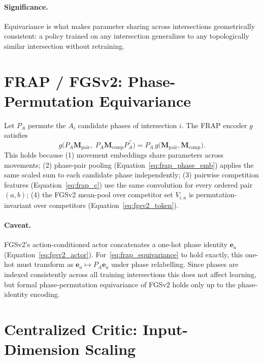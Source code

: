 \paragraph{Significance.} Equivariance is what makes parameter sharing across intersections geometrically consistent: a policy trained on any intersection generalizes to any topologically similar intersection without retraining.

\section{FRAP / FGSv2: Phase-Permutation Equivariance}
\label{sec:Appendix_FRAP_equivariance}

Let $P_A$ permute the $A_i$ candidate phases of intersection $i$. The FRAP encoder $g$ satisfies
\begin{equation}
  g\bigl(P_A\mathbf{M}_{\mathrm{pair}},\; P_A\mathbf{M}_{\mathrm{comp}}P_A^\top\bigr)
  = P_A\,g\bigl(\mathbf{M}_{\mathrm{pair}},\mathbf{M}_{\mathrm{comp}}\bigr).
  \label{eq:frap_equivariance}
\end{equation}
This holds because (1) movement embeddings share parameters across movements; (2) phase-pair pooling (Equation~\ref{eq:frap_phase_emb}) applies the same scaled sum to each candidate phase independently; (3) pairwise competition features (Equation~\ref{eq:frap_c}) use the same convolution for every ordered pair $(a,b)$; (4) the FGSv2 mean-pool over competitor set $V_{i,a}$ is permutation-invariant over competitors (Equation~\ref{eq:fgsv2_token}).

\paragraph{Caveat.} FGSv2's action-conditioned actor concatenates a one-hot phase identity $\mathbf{e}_a$ (Equation~\ref{eq:fgsv2_actor}). For~\eqref{eq:frap_equivariance} to hold exactly, this one-hot must transform as $\mathbf{e}_a\mapsto P_A\mathbf{e}_a$ under phase relabelling. Since phases are indexed consistently across all training intersections this does not affect learning, but formal phase-permutation equivariance of FGSv2 holds only up to the phase-identity encoding.

\section{Centralized Critic: Input-Dimension Scaling}
\label{sec:Appendix_critic_complexity}

